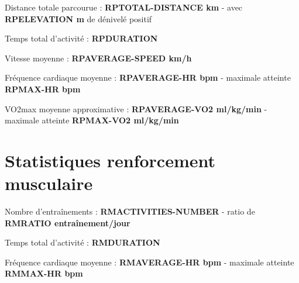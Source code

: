 \documentclass[a4paper,french,11pt]{report}
\begin{document}
\textbullet Distance totale parcourue : \textbf{RPTOTAL-DISTANCE km} -
avec \textbf{RPELEVATION m} de dénivelé positif

\textbullet Temps total d'activité : \textbf{RPDURATION}

\textbullet Vitesse moyenne : \textbf{RPAVERAGE-SPEED km/h}

\textbullet Fréquence cardiaque moyenne : \textbf{RPAVERAGE-HR bpm} -
maximale atteinte \textbf{RPMAX-HR bpm}

\textbullet VO2max moyenne approximative : \textbf{RPAVERAGE-VO2 ml/kg/min} -
maximale atteinte \textbf{RPMAX-VO2 ml/kg/min}


\section*{Statistiques renforcement musculaire}
\thispagestyle{empty}


\textbullet Nombre d'entraînements : \textbf{RMACTIVITIES-NUMBER} -
ratio de \textbf{RMRATIO entraînement/jour}

\textbullet Temps total d'activité : \textbf{RMDURATION}

\textbullet Fréquence cardiaque moyenne : \textbf{RMAVERAGE-HR bpm} -
maximale atteinte \textbf{RMMAX-HR bpm}

\end{document}
